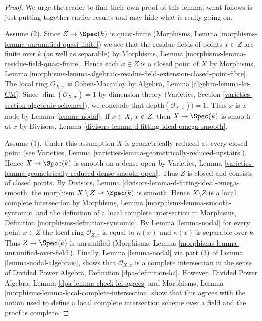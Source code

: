\begin{proof}
We urge the reader to find their own proof of
this lemma; what follows is just putting together earlier results
and may hide what is really going on.

\medskip\noindent
Assume (2). Since $Z \to \Spec(k)$ is quasi-finite
(Morphisms, Lemma \ref{morphisms-lemma-unramified-quasi-finite})
we see that the residue fields of points $x \in Z$ are finite
over $k$ (as well as separable) by
Morphisms, Lemma \ref{morphisms-lemma-residue-field-quasi-finite}.
Hence each $x \in Z$ is a closed point of $X$ by
Morphisms, Lemma
\ref{morphisms-lemma-algebraic-residue-field-extension-closed-point-fibre}.
The local ring $\mathcal{O}_{X, x}$ is Cohen-Macaulay by
Algebra, Lemma \ref{algebra-lemma-lci-CM}.
Since $\dim(\mathcal{O}_{X, x}) = 1$ by dimension theory
(Varieties, Section \ref{varieties-section-algebraic-schemes}), we conclude
that $\text{depth}(\mathcal{O}_{X, x})) = 1$. Thus $x$ is a node
by Lemma \ref{lemma-nodal}. If $x \in X$, $x \not \in Z$, then
$X \to \Spec(k)$ is smooth at $x$ by
Divisors, Lemma \ref{divisors-lemma-d-fitting-ideal-omega-smooth}.

\medskip\noindent
Assume (1). Under this assumption $X$ is geometrically reduced
at every closed point (see
Varieties, Lemma \ref{varieties-lemma-geometrically-reduced-upstairs}).
Hence $X \to \Spec(k)$ is smooth on a dense open by
Varieties, Lemma \ref{varieties-lemma-geometrically-reduced-dense-smooth-open}.
Thus $Z$ is closed and consists of closed points.
By Divisors, Lemma \ref{divisors-lemma-d-fitting-ideal-omega-smooth}
the morphism $X \setminus Z \to \Spec(k)$ is smooth.
Hence $X \setminus Z$ is a local complete intersection by
Morphisms, Lemma \ref{morphisms-lemma-smooth-syntomic}
and the definition of a local complete intersection in
Morphisms, Definition \ref{morphisms-definition-syntomic}.
By Lemma \ref{lemma-nodal} for every point $x \in Z$
the local ring $\mathcal{O}_{Z, x}$ is equal to $\kappa(x)$
and $\kappa(x)$ is separable over $k$. Thus $Z \to \Spec(k)$
is unramified (Morphisms, Lemma \ref{morphisms-lemma-unramified-over-field}).
Finally, Lemma \ref{lemma-nodal} via part (3) of
Lemma \ref{lemma-nodal-algebraic}, shows that $\mathcal{O}_{X, x}$
is a complete intersection in the sense of
Divided Power Algebra, Definition \ref{dpa-definition-lci}.
However, Divided Power Algebra, Lemma \ref{dpa-lemma-check-lci-agrees}
and Morphisms, Lemma \ref{morphisms-lemma-local-complete-intersection}
show that this agrees with the notion used to define a local
complete intersection scheme over a field and the proof is complete.
\end{proof}

